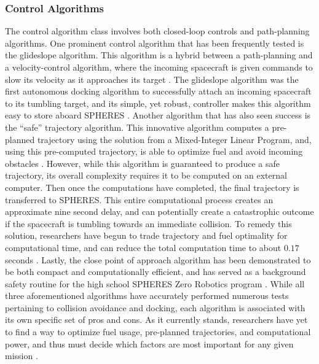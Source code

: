 \documentclass[journal, 10pt]{IEEEtran}
\begin{document}
\subsubsection{Control Algorithms}
The control algorithm class involves both closed-loop controls and path-planning algorithms. One prominent control algorithm that has been frequently tested is the glideslope algorithm. This algorithm is a hybrid between a path-planning and a velocity-control algorithm, where the incoming spacecraft is given commands to slow its velocity as it approaches its target \cite{SPHERES_form, SPHERES_micro, dist, virt_sim}. The glideslope algorithm was the first autonomous docking algorithm to successfully attach an incoming spacecraft to its tumbling target, and its simple, yet robust, controller makes this algorithm easy to store aboard SPHERES \cite{SPHERES_micro}. Another algorithm that has also seen success is the ``safe'' trajectory algorithm. This innovative algorithm computes a pre-planned trajectory using the solution from a Mixed-Integer Linear Program, and, using this pre-computed trajectory, is able to optimize fuel and avoid incoming obstacles \cite{SPHERES_micro}. However, while this algorithm is guaranteed to produce a safe trajectory, its overall complexity requires it to be computed on an external computer. Then once the computations have completed, the final trajectory is transferred to SPHERES. This entire computational process creates an approximate nine second delay, and can potentially create a catastrophic outcome if the spacecraft is tumbling towards an immediate collision. To remedy this solution, researchers have begun to trade trajectory and fuel optimality for computational time, and can reduce the total computation time to about $0.17$ seconds \cite{SPHERES_micro}. Lastly, the close point of approach algorithm has been demonstrated to be both compact and computationally efficient, and has served as a background safety routine for the high school SPHERES Zero Robotics program \cite{virt_sim}. While all three aforementioned algorithms have accurately performed numerous tests pertaining to collision avoidance and docking, each algorithm is associated with its own specific set of pros and cons. As it currently stands, researchers have yet to find a way to optimize fuel usage, pre-planned trajectories, and computational power, and thus must decide which factors are most important for any given mission \cite{SPHERES_form, SPHERES_micro, dist, virt_sim}.
\end{document}
